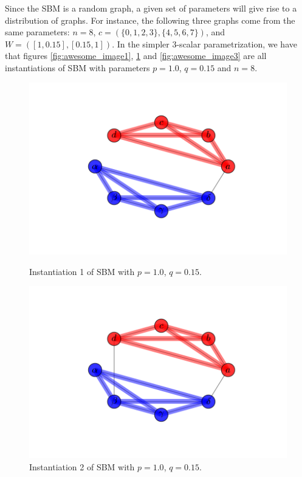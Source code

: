 Since the SBM is a random graph, a given set of parameters will give rise to a distribution of graphs.  For instance, the following three graphs come from the same parameters: $n = 8$, $c = (\{0,1,2,3\}, \{4,5,6,7\})$, and $W =([1,0.15],[0.15,1])$. In the simpler $3$-scalar parametrization, we have that figures \ref{fig:awesome_image1}, \ref{fig:awesome_image2} and \ref{fig:awesome_image3} are all instantiations of SBM with parameters $p=1.0$, $q=0.15$ and $n=8$.  
\begin{figure}[h]
  \includegraphics[width=\linewidth]{labels_and_colors_1.png}
  \caption{Instantiation 1 of SBM with $p=1.0$, $q=0.15$.}\label{fig:awesome_image1}
\endminipage\hfill
{}
  \includegraphics[width=\linewidth]{labels_and_colors_2.png}
  \caption{Instantiation 2 of SBM with $p=1.0$, $q=0.15$.}\label{fig:awesome_image2}
\endminipage\hfill
{}%

\end{figure}
